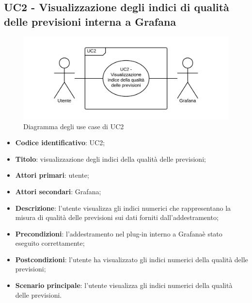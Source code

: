\subsection{UC2 - Visualizzazione degli indici di qualità delle previsioni interna a Grafana}
\begin{figure}[H]
\includegraphics{img/UC2_-_Visualizzazione_indice_della_qualit_delle_previsioni.png}
\caption{Diagramma degli use case di UC2}
\end{figure}
\begin{itemize}
	\item \textbf{Codice identificativo}: UC2;
	\item \textbf{Titolo}: visualizzazione degli indici della qualità delle previsioni;
	\item \textbf{Attori primari}: utente;
	\item \textbf{Attori secondari}: Grafana\glo;
	\item \textbf{Descrizione}: l'utente visualizza gli indici numerici che rappresentano la misura di qualità delle previsioni sui dati forniti dall'addestramento;
	\item \textbf{Precondizioni}: l'addestramento nel plug-in interno a Grafana\glosp è stato eseguito correttamente;
	\item \textbf{Postcondizioni}: l'utente ha visualizzato gli indici numerici della qualità delle previsioni;
	\item \textbf{Scenario principale}: l'utente visualizza gli indici numerici della qualità delle previsioni.
\end{itemize}
